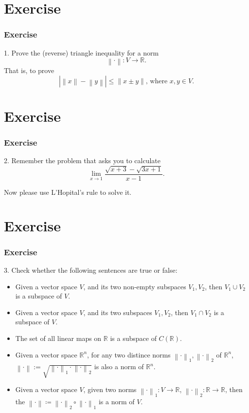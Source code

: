 \documentclass[12pt, t]{beamer}
\begin{document}
\section{Exercise}
\begin{frame}
    \frametitle{Exercise}
    1. Prove the (reverse) triangle inequality for a norm
    \begin{equation*}
        \left\lVert \cdot \right\rVert\colon V\rightarrow \mathbb{R}.
    \end{equation*}
    That is, to prove
    \begin{equation*}
        \left\vert \left\lVert x\right\rVert - \left\lVert y\right\rVert \right\vert \leq \left\lVert x\pm y\right\rVert \text{, where }x,y\in V.
    \end{equation*}
\end{frame}

\section{Exercise}
\begin{frame}
    \frametitle{Exercise}
    2. Remember the problem that asks you to calculate
    \begin{equation*}
        \underset{x\rightarrow 1}{\lim}\frac{\sqrt{x+3}-\sqrt{3x+1}}{x-1}.
    \end{equation*}

    Now please use L'Hopital's rule to solve it.
\end{frame}

\section{Exercise}
\begin{frame}
    \frametitle{Exercise}
    3. Check whether the following sentences are true or false:
    \begin{itemize}
        \item Given a vector space $V$, and its two non-empty subspaces $V_1, V_2$, then $V_1\cup V_2$ is a subspace of $V$.
        \item Given a vector space $V$, and its two subspaces $V_1,V_2$, then $V_1\cap V_2$ is a subspace of $V$.
        \item The set of all linear maps on $\mathbb{R}$ is a subspace of $C(\mathbb{R})$.
        \item Given a vector space $\mathbb{R}^n$, for any two distince norms $\left\lVert \cdot \right\rVert_1, \left\lVert \cdot \right\rVert_2$ of $\mathbb{R}^n$, $\left\lVert \cdot \right\rVert:=\sqrt{\left\lVert \cdot \right\rVert_1\cdot\left\lVert \cdot \right\rVert_2}$ is also a norm of $\mathbb{R}^n$.
        \item Given a vector space $V$, given two norms $\left\lVert \cdot \right\rVert_1\colon V\rightarrow\mathbb{R}$, $\left\lVert \cdot \right\rVert_2\colon \mathbb{R}\rightarrow\mathbb{R}$, then the $\left\lVert \cdot \right\rVert\coloneqq \left\lVert \cdot \right\rVert_2\circ\left\lVert \cdot \right\rVert_1$ is a norm of $V$.
    \end{itemize}
\end{frame}
\end{document}
